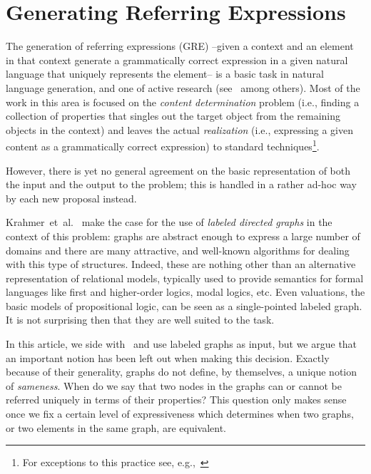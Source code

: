 \section{Generating Referring Expressions}

The generation of referring expressions (GRE) --given a context and
an element in that context generate a grammatically correct
expression in a given natural language that uniquely represents the
element-- is a basic task in natural language generation, and one of
active research
(see~\cite{dale89cooking,dale91:_gener_refer_expres_invol_relat,Dale1995,Stone2000,deemter02:_gener_refer_expres}
among others). Most of the work in this area is focused on the
\emph{content determination} problem (i.e., finding a collection of
properties that singles out the target object from the remaining
objects in the context) and leaves the actual \emph{realization}
(i.e., expressing a given content as a grammatically correct
expression) to standard techniques\footnote{For exceptions to this
practice see, e.g.,~\cite{hora:algo97,ston:text98}}.

However, there is yet no general agreement on the basic representation of both the input
and the output to the problem; this is handled in a rather ad-hoc way by each
new proposal instead.

Krahmer~et~al.~\cite{Krahmer2003} make the case for the use of \emph{labeled
directed graphs} in the context of this problem: graphs are abstract
enough to express a large number of domains and there are many
attractive, and well-known algorithms for dealing with this type of
structures. Indeed, these are nothing other than
an alternative representation of relational models, typically used to provide
semantics for formal languages like first and higher-order logics,
modal logics, etc. Even valuations, the basic models of
propositional logic, can be seen as a single-pointed labeled graph.
It is not surprising then that they are well suited to the task.

In this article, we side with~\cite{Krahmer2003} and use labeled
graphs as input, but we argue that an important notion has been left
out when making this decision. Exactly because of their generality,
graphs do not define, by themselves, a unique notion of
\emph{sameness}. When do we say that two nodes in the graphs can or
cannot be referred uniquely in terms of their properties?  This
question only makes sense once we fix a certain level of
expressiveness which determines when two graphs, or two elements in
the same graph, are equivalent.


